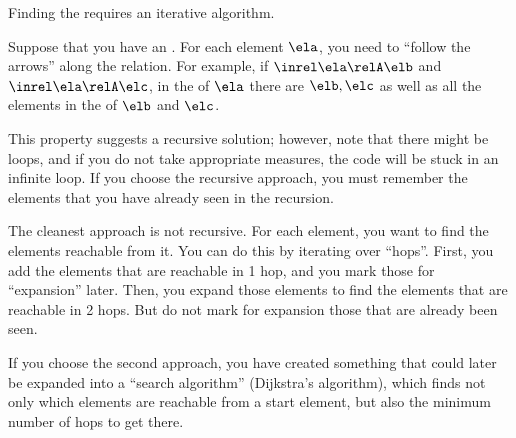 
\begin{hint}
    Finding the  requires an iterative algorithm.

    Suppose that you have an  \relA.
    For each element $\ela$, you need to ``follow the arrows'' along the relation.
    For example, if  $\inrel \ela \relA \elb$ and  $\inrel \ela \relA \elc$, in the  of $\ela$ there are $\elb, \elc$ as well as all the elements in the  of $\elb$ and $\elc$.

    This property suggests a recursive solution; however, note that there might be loops, and if you do not take appropriate measures, the code will be stuck in an infinite loop.
    If you choose the recursive approach, you must remember the elements that you have already seen in the recursion.

    The cleanest approach is not recursive.
    For each element, you want to find the elements reachable from it.
    You can do this by iterating over ``hops''.
    First, you add the elements that are reachable in 1 hop, and you mark those for ``expansion'' later.
    Then, you expand those elements to find the elements that are reachable in 2 hops.
    But do not mark for expansion those that are already been seen.

    If you choose the second approach, you have created something that could later be expanded into a ``search algorithm'' (Dijkstra's algorithm), which finds not only which elements are reachable from a start element, but also the minimum number of hops to get there.
\end{hint}
